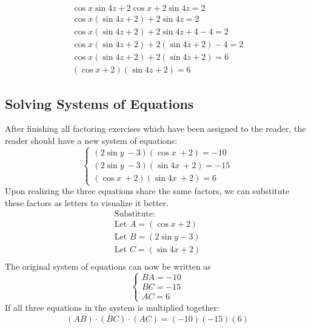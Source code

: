 \documentclass[a4paper,12pt]{article}
\begin{document}
\begin{equation}
    \begin{split}
        \cos x\sin 4z + 2\cos x + 2\sin 4z = 2 \\
        \cos x(\sin 4z + 2) + 2\sin 4z = 2 \\
        \cos x(\sin 4z + 2) + 2\sin 4z + 4- 4 = 2 \\
        \cos x(\sin 4z + 2) + 2(\sin 4z + 2)- 4 = 2 \\
        \cos x(\sin 4z + 2) + 2(\sin 4z + 2) = 6 \\
        (\cos x+2)(\sin 4z + 2)= 6
    \end{split}
\end{equation}

\subsection*{Solving Systems of Equations}
After finishing all factoring exercises which have been assigned to the reader, the reader should have a new system of equations:
$$
\begin{cases}
(2\sin y\ - 3)(\cos x\ + 2) = -10 \\
(2\sin y\ - 3)(\sin 4x\ + 2) = -15 \\
(\cos x\ + 2)(\sin 4x\ + 2) = 6 
\end{cases}
$$
Upon realizing the three equations share the same factors, we can substitute these factors as letters to visualize it better.
\begin{multline}
    \text{Substitute:} \\
    \text{Let } A = (\cos x+2) \\
    \text{Let } B = (2\sin y-3) \\
    \text{Let } C = (\sin 4x+2) \\
\end{multline}
The original system of equations can now be written as
$$
\begin{cases}
    BA = -10 \\
    BC = -15 \\
    AC = 6
\end{cases}
$$
If all three equations in the system is multiplied together:
\begin{equation}
    \begin{split}
        (AB)\cdot(BC)\cdot(AC) = (-10)(-15)(6)
    \end{split}
\end{equation}
\end{document}
